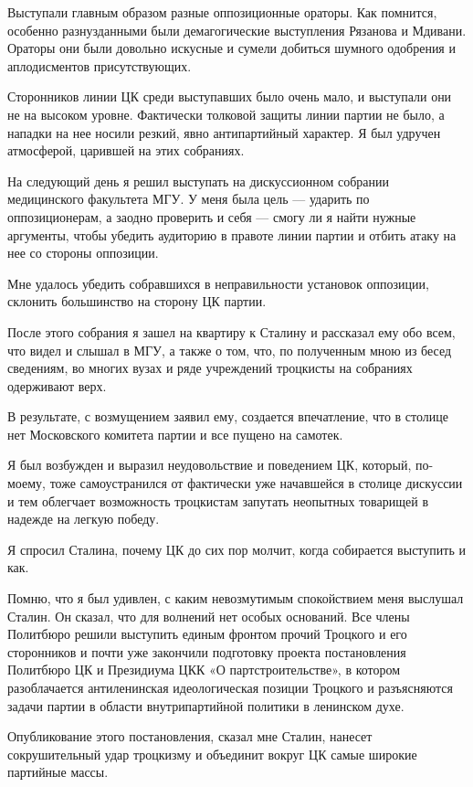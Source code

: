 \documentclass[12pt, a4paper, openany]{book}
\begin{document}
Выступали главным образом разные оппозиционные ораторы. Как помнится, особенно разнузданными были демагогические выступления Рязанова и Мдивани. Ораторы они были довольно искусные и сумели добиться шумного одобрения и аплодисментов присутствующих.

Сторонников линии ЦК среди выступавших было очень мало, и выступали они не на высоком уровне. Фактически толковой защиты линии партии не было, а нападки на нее носили резкий, явно антипартийный характер. Я был удручен атмосферой, царившей на этих собраниях.

На следующий день я решил выступать на дискуссионном собрании медицинского факультета МГУ. У меня была цель — ударить по оппозиционерам, а заодно проверить и себя — смогу ли я найти нужные аргументы, чтобы убедить аудиторию в правоте линии партии и отбить атаку на нее со стороны оппозиции.

Мне удалось убедить собравшихся в неправильности установок оппозиции, склонить большинство на сторону ЦК партии.

После этого собрания я зашел на квартиру к Сталину и рассказал ему обо всем, что видел и слышал в МГУ, а также о том, что, по полученным мною из бесед сведениям, во многих вузах и ряде учреждений троцкисты на собраниях одерживают верх.

В результате, с возмущением заявил ему, создается впечатление, что в столице нет Московского комитета партии и все пущено на самотек.

Я был возбужден и выразил неудовольствие и поведением ЦК, который, по-моему, тоже самоустранился от фактически уже начавшейся в столице дискуссии и тем облегчает возможность троцкистам запутать неопытных товарищей в надежде на легкую победу.

Я спросил Сталина, почему ЦК до сих пор молчит, когда собирается выступить и как.

Помню, что я был удивлен, с каким невозмутимым спокойствием меня выслушал Сталин. Он сказал, что для волнений нет особых оснований. Все члены Политбюро решили выступить единым фронтом прочий Троцкого и его сторонников и почти уже закончили подготовку проекта постановления Политбюро ЦК и Президиума ЦКК «О партстроительстве», в котором разоблачается антиленинская идеологическая позиции Троцкого и разъясняются задачи партии в области внутрипартийной политики в ленинском духе.

Опубликование этого постановления, сказал мне Сталин, нанесет сокрушительный удар троцкизму и объединит вокруг ЦК самые широкие партийные массы.
\end{document}
